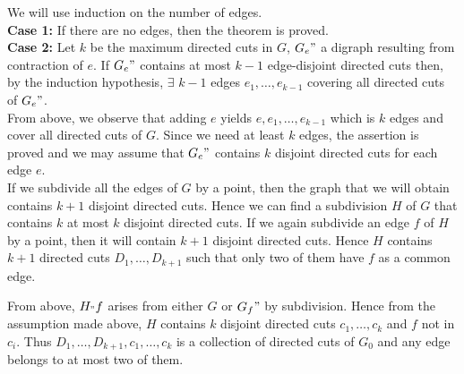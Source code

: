 \documentclass[8pt]{beamer}
\begin{document}
\begin{frame}
We will use induction on the number of edges. \\
\textbf{Case 1:} If there are no edges, then the theorem is proved. \\
\textbf{Case 2:} Let $k$ be the maximum directed cuts in $G$, $G_e"$ a digraph 
resulting from contraction of $e$. 
If $G_e"$ contains at most $k-1$ edge-disjoint directed cuts then, by the induction hypothesis, $\exists$ $k-1$ edges $e_1,\dots,e_{k-1}$ covering all directed cuts of $G_e"$. \\
From above, we observe that adding $e$ yields $e, e_1,\dots,e_{k-1}$ which is $k$ edges and cover all directed cuts of $G$. Since we need at least $k$ edges, the assertion is proved and we may assume that $G_e"$ contains $k$ disjoint directed cuts for each edge $e$.\\

If we subdivide all the edges of $G$ by a point, then the graph that we will obtain contains $k+1$ disjoint directed cuts. Hence we can find a subdivision $H$ of $G$ that contains $k$ at most $k$ disjoint directed cuts. If we again subdivide an edge $f$ of $H$ by a point, then it will contain $k+1$ disjoint directed cuts. Hence $H$ contains $k+1$ directed cuts $D_1,\dots,D_{k+1}$ such that only two of them have $f$ as a common edge. 

From above, $H_"f$ arises from either $G$ or $G_f"$ by subdivision. Hence from the assumption made above, $H$ contains $k$ disjoint directed cuts $c_1,\dots,c_k$ and $f$ not in $c_i$. Thus $D_1,\dots,D_{k+1},c_1,\dots,c_k$ is a collection of directed cuts of $G_0$ and any edge belongs to at most two of them. 

\end{frame}
\end{document}
